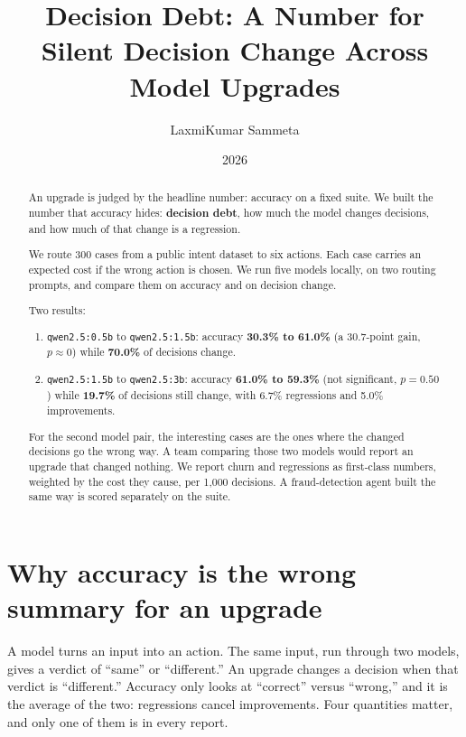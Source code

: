 \documentclass[11pt]{article}
\title{Decision Debt: A Number for Silent Decision Change Across Model Upgrades}
\author{LaxmiKumar Sammeta}
\date{2026}
\begin{document}
\maketitle

\begin{abstract}
An upgrade is judged by the headline number: accuracy on a fixed suite. We
built the number that accuracy hides: \textbf{decision debt}, how much the
model changes decisions, and how much of that change is a regression.

We route 300 cases from a public intent dataset to six actions. Each case
carries an expected cost if the wrong action is chosen. We run five models
locally, on two routing prompts, and compare them on accuracy and on
decision change.

Two results:

\begin{enumerate}
\item \texttt{qwen2.5:0.5b} to \texttt{qwen2.5:1.5b}: accuracy \textbf{30.3\% to 61.0\%}
  (a 30.7-point gain, $p \approx 0$) while \textbf{70.0\%} of decisions change.
\item \texttt{qwen2.5:1.5b} to \texttt{qwen2.5:3b}: accuracy \textbf{61.0\% to 59.3\%}
  (not significant, $p=0.50$) while \textbf{19.7\%} of decisions still change,
  with 6.7\% regressions and 5.0\% improvements.
\end{enumerate}

For the second model pair, the interesting cases are the ones where the
changed decisions go the wrong way. A team comparing those two models would
report an upgrade that changed nothing. We report churn and regressions as
first-class numbers, weighted by the cost they cause, per 1,000 decisions.
A fraud-detection agent built the same way is scored separately on the suite.
\end{abstract}

\section{Why accuracy is the wrong summary for an upgrade}

A model turns an input into an action. The same input, run through two
models, gives a verdict of ``same'' or ``different.'' An upgrade changes a
decision when that verdict is ``different.'' Accuracy only looks at
``correct'' versus ``wrong,'' and it is the average of the two: regressions
cancel improvements. Four quantities matter, and only one of them is in every
report.
\end{document}
